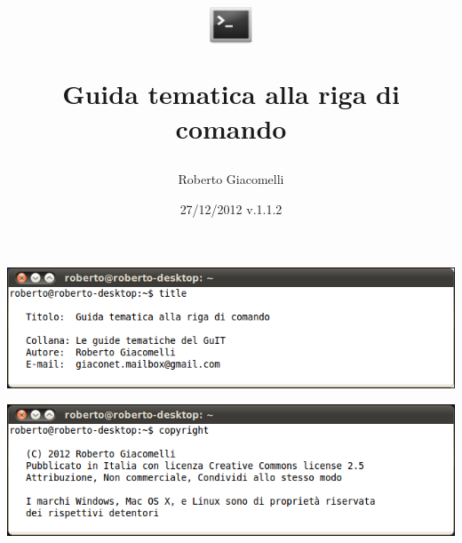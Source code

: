 \documentclass[b5paper,11pt,openany]{guidatematica}
\title{\includegraphics[width=0.1\textwidth]{image/terminal-icon}\par Guida tematica alla riga di comando}
\author{Roberto Giacomelli}
\date{27/12/2012 v.1.1.2}
\begin{document}
\frontmatter
\maketitle
\rule{0pt}{1pt}

\vfill

\noindent\includegraphics[width=\textwidth]{image/title}

\bigskip
\noindent\includegraphics[width=\textwidth]{image/copyright}

\bigskip
\scalebox{1.6}{\cc \ccby \ccnc \ccsa}
\newpage
\tableofcontents
\newpage



\mainmatter









\backmatter

\end{document}
